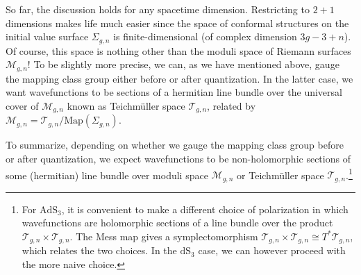\documentclass[12pt,a4paper]{article}
\begin{document}
So far, the discussion holds for any spacetime dimension. Restricting to $2{+}1$ dimensions makes life much easier since the space of conformal structures on the initial value surface $\Sigma_{g,n}$ is finite-dimensional (of complex dimension $3g-3+n$). Of course, this space is nothing other than the moduli space of Riemann surfaces $\mathcal{M}_{g,n}$! To be slightly more precise, we can, as we have mentioned above, gauge the mapping class group either before or after quantization. In the latter case, we want wavefunctions to be sections of a hermitian line bundle over the universal cover of $\mathcal{M}_{g,n}$ known as Teichm\"uller space $\mathcal{T}_{g,n}$, related by $\mathcal{M}_{g,n}=\mathcal{T}_{g,n}/\text{Map}(\Sigma_{g,n})$.

To summarize, depending on whether we gauge the mapping class group before or after quantization, we expect wavefunctions to be non-holomorphic sections of some (hermitian) line bundle over moduli space $\mathcal{M}_{g,n}$ or Teichm\"uller space $\mathcal{T}_{g,n}$.\footnote{For $\mathrm{AdS}_3$, it is convenient to make a different choice of polarization in which wavefunctions are holomorphic sections of a line bundle over the product $\mathcal{T}_{g,n} \times \mathcal{T}_{g,n}$. The Mess map \cite{Mess:2007} gives a symplectomorphism $\mathcal{T}_{g,n} \times \mathcal{T}_{g,n} \cong T^* \mathcal{T}_{g,n}$, which relates the two choices. In the $\mathrm{dS}_3$ case, we can however proceed with the more naive choice.} 
\end{document}
